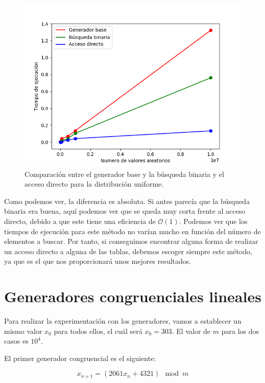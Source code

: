 \documentclass[11pt,a4paper]{report}
\begin{document}
\begin{figure}[H]
\centering
\includegraphics[scale=0.6]{img/mejora3.png}
\caption{Comparación entre el generador base y la búsqueda binaria y el acceso directo para la distribución uniforme.}
\end{figure}

Como podemos ver, la diferencia es absoluta. Si antes parecía que la búsqueda binaria era buena, aquí podemos ver que se
queda muy corta frente al acceso directo, debido a que este tiene una eficiencia de $\mathcal{O}(1)$. Podemos ver
que los tiempos de ejecución para este método no varían mucho en función del número de elementos a buscar. Por tanto, si
conseguimos encontrar alguna forma de realizar un acceso directo a alguna de las tablas, debemos escoger siempre este método,
ya que es el que nos proporcionará unos mejores resultados.

\section{Generadores congruenciales lineales}

Para realizar la experimentación con los generadores, vamos a establecer un mismo valor $x_0$ para todos ellos, el cuál
será $x_0 = 303$. El valor de $m$ para los dos casos es $10^4$.

El primer generador congruencial es el siguiente:

\begin{equation}
\label{eq:gen1}
	x_{n+1} = (2061x_n + 4321) \mod m
\end{equation}
\end{document}

